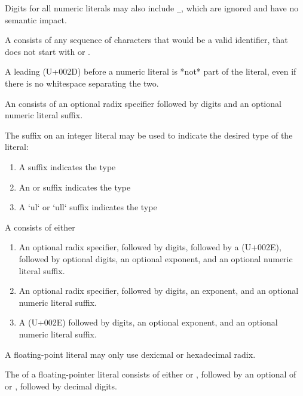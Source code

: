 Digits for all numeric literals may also include \lstinline{_}, which are ignored and have no semantic impact.

A  consists of any sequence of characters that would be a valid identifier, that does not start with  or .

\begin{Note}
A leading \Char{-} (U+002D) before a numeric literal is *not* part of the literal, even if there is no whitespace separating the two.
\end{Note}


An  consists of an optional radix specifier followed by digits and an optional numeric literal suffix.

The suffix on an integer literal may be used to indicate the desired type of the literal:

\begin{enumerate}
    \item{A  suffix indicates the  type}
    \item{An  or  suffix indicates the  type}
    \item{A `ul` or `ull` suffix indicates the  type}
\end{enumerate}


A  consists of either

\begin{enumerate}
    \item{An optional radix specifier, followed by digits, followed by a  (U+002E), followed by optional digits, an optional exponent, and an optional numeric literal suffix.}
    \item{An optional radix specifier, followed by digits, an exponent, and an optional numeric literal suffix.}
    \item{A  (U+002E) followed by digits, an optional exponent, and an optional numeric literal suffix.}
\end{enumerate}

A floating-point literal may only use dexicmal or hexadecimal radix.

The  of a floating-pointer literal consists of either  or , followed by an optional  of \Char{+} or \Char{-}, followed by decimal digits.

